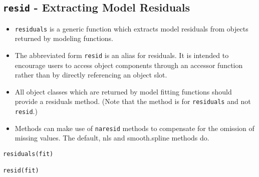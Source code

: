 \documentclass[residuals.tex]{subfiles}
\begin{document}
\Large
\newpage
\subsection{\texttt{resid} - Extracting Model Residuals}


\begin{itemize}
\item \texttt{residuals} is a generic function which extracts model residuals from objects returned by modeling functions. 

\item The abbreviated form \texttt{resid} is an alias for residuals. It is intended to encourage users to access object components through an accessor function rather than by directly referencing an object slot. 

\item All object classes which are returned by model fitting functions should provide a residuals method. (Note that the method is for \texttt{residuals} and not \texttt{resid}.) 

\item Methods can make use of \texttt{naresid} methods to compensate for the omission of missing values. The default, nls and smooth.spline methods do. 
\end{itemize}

\begin{framed}
\begin{verbatim}
residuals(fit)

resid(fit)
\end{verbatim}
\end{framed}
\end{document}
